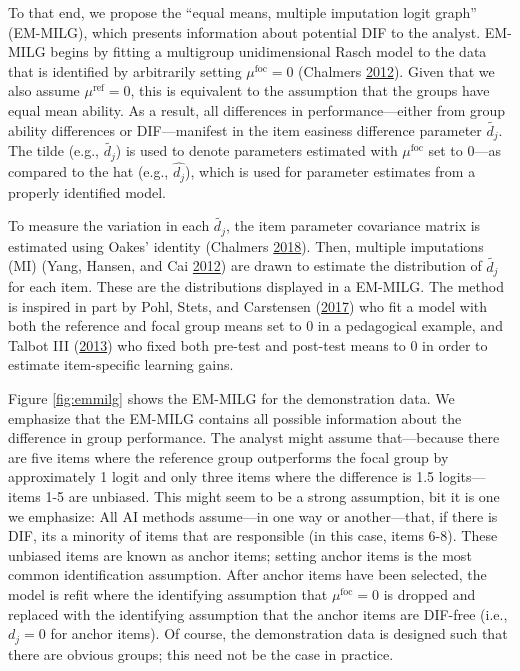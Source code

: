 \documentclass[
  11pt,
]{article}
\begin{document}
To that end, we propose the \enquote{equal means, multiple imputation logit graph} (EM-MILG), which presents information about potential DIF to the analyst. EM-MILG begins by fitting a multigroup unidimensional Rasch model to the data that is identified by arbitrarily setting \(\mu^\text{foc} = 0\) (Chalmers \protect\hyperlink{ref-chalmers2012mirt}{2012}). Given that we also assume \(\mu^\text{ref} = 0\), this is equivalent to the assumption that the groups have equal mean ability. As a result, all differences in performance---either from group ability differences or DIF---manifest in the item easiness difference parameter \(\tilde{d_j}\). The tilde (e.g., \(\tilde{d_j}\)) is used to denote parameters estimated with \(\mu^\text{foc}\) set to \(0\)---as compared to the hat (e.g., \(\hat{d_j}\)), which is used for parameter estimates from a properly identified model.

To measure the variation in each \(\tilde{{d_j}}\), the item parameter covariance matrix is estimated using Oakes' identity (Chalmers \protect\hyperlink{ref-chalmers2018numerical}{2018}). Then, multiple imputations (MI) (Yang, Hansen, and Cai \protect\hyperlink{ref-yang2012characterizing}{2012}) are drawn to estimate the distribution of \(\tilde{d_j}\) for each item. These are the distributions displayed in a EM-MILG. The method is inspired in part by Pohl, Stets, and Carstensen (\protect\hyperlink{ref-pohl2017cluster}{2017}) who fit a model with both the reference and focal group means set to 0 in a pedagogical example, and Talbot III (\protect\hyperlink{ref-talbot2013taking}{2013}) who fixed both pre-test and post-test means to 0 in order to estimate item-specific learning gains.

Figure \ref{fig:emmilg} shows the EM-MILG for the demonstration data. We emphasize that the EM-MILG contains all possible information about the difference in group performance. The analyst might assume that---because there are five items where the reference group outperforms the focal group by approximately 1 logit and only three items where the difference is 1.5 logits---items 1-5 are unbiased. This might seem to be a strong assumption, bit it is one we emphasize: All AI methods assume---in one way or another---that, if there is DIF, its a minority of items that are responsible (in this case, items 6-8). These unbiased items are known as anchor items; setting anchor items is the most common identification assumption. After anchor items have been selected, the model is refit where the identifying assumption that \(\mu^\text{foc} = 0\) is dropped and replaced with the identifying assumption that the anchor items are DIF-free (i.e., \(d_j = 0\) for anchor items). Of course, the demonstration data is designed such that there are obvious groups; this need not be the case in practice.
\end{document}
